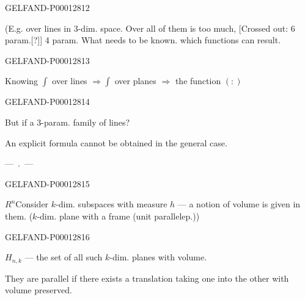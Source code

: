 \begin{GelfandAdjacentEvidence}{GELFAND-P000128}{12}

(E.g. over lines in 3-dim. space. Over all of them is too much,
[Crossed out: 6 param.[?]]
4 param. What needs to be known. which functions can result.
\end{GelfandAdjacentEvidence}
\begin{GelfandAdjacentEvidence}{GELFAND-P000128}{13}

Knowing $\int$ over lines $\Rightarrow\int$ over planes $\Rightarrow$ the function $(:)$
\end{GelfandAdjacentEvidence}
\begin{GelfandAdjacentEvidence}{GELFAND-P000128}{14}

But if a 3-param. family of lines?

An explicit formula cannot be obtained in the general case.

\begin{center}---\, .\, ---\end{center}
\end{GelfandAdjacentEvidence}
\begin{GelfandAdjacentEvidence}{GELFAND-P000128}{15}

$R^n$\quad Consider $k$-dim. subspaces with measure $h$ --- a notion of volume is given in them. ($k$-dim. plane with a frame (unit parallelep.))
\end{GelfandAdjacentEvidence}
\begin{GelfandAdjacentEvidence}{GELFAND-P000128}{16}

$H_{n, k}$ --- the set of all such $k$-dim. planes with volume.

They are parallel if there exists a translation taking one into the other with volume preserved.
\end{GelfandAdjacentEvidence}



